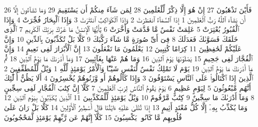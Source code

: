 {\tiny\colorbox{cl_aya}{26}} فَأَيْنَ تَذْهَبُونَ
{\tiny\colorbox{cl_aya}{27}} إِنْ هُوَ إِلَّا ذِكْرٌ لِّلْعَٰلَمِينَ
{\tiny\colorbox{cl_aya}{28}} لِمَن شَآءَ مِنكُمْ أَن يَسْتَقِيمَ
{\tiny\colorbox{cl_aya}{29}} وَمَا تَشَآءُونَ إِلَّآ أَن يَشَآءَ ٱللَّهُ رَبُّ ٱلْعَٰلَمِينَ
{\tiny\colorbox{cl_aya}{1}} إِذَا ٱلسَّمَآءُ ٱنفَطَرَتْ
{\tiny\colorbox{cl_aya}{2}} وَإِذَا ٱلْكَوَاكِبُ ٱنتَثَرَتْ
{\tiny\colorbox{cl_aya}{3}} وَإِذَا ٱلْبِحَارُ فُجِّرَتْ
{\tiny\colorbox{cl_aya}{4}} وَإِذَا ٱلْقُبُورُ بُعْثِرَتْ
{\tiny\colorbox{cl_aya}{5}} عَلِمَتْ نَفْسٌ مَّا قَدَّمَتْ وَأَخَّرَتْ
{\tiny\colorbox{cl_aya}{6}} يَٰٓأَيُّهَا ٱلْإِنسَٰنُ مَا غَرَّكَ بِرَبِّكَ ٱلْكَرِيمِ
{\tiny\colorbox{cl_aya}{7}} ٱلَّذِى خَلَقَكَ فَسَوَّىٰكَ فَعَدَلَكَ
{\tiny\colorbox{cl_aya}{8}} فِىٓ أَىِّ صُورَةٍ مَّا شَآءَ رَكَّبَكَ
{\tiny\colorbox{cl_aya}{9}} كَلَّا بَلْ تُكَذِّبُونَ بِٱلدِّينِ
{\tiny\colorbox{cl_aya}{10}} وَإِنَّ عَلَيْكُمْ لَحَٰفِظِينَ
{\tiny\colorbox{cl_aya}{11}} كِرَامًا كَٰتِبِينَ
{\tiny\colorbox{cl_aya}{12}} يَعْلَمُونَ مَا تَفْعَلُونَ
{\tiny\colorbox{cl_aya}{13}} إِنَّ ٱلْأَبْرَارَ لَفِى نَعِيمٍ
{\tiny\colorbox{cl_aya}{14}} وَإِنَّ ٱلْفُجَّارَ لَفِى جَحِيمٍ
{\tiny\colorbox{cl_aya}{15}} يَصْلَوْنَهَا يَوْمَ ٱلدِّينِ
{\tiny\colorbox{cl_aya}{16}} وَمَا هُمْ عَنْهَا بِغَآئِبِينَ
{\tiny\colorbox{cl_aya}{17}} وَمَآ أَدْرَىٰكَ مَا يَوْمُ ٱلدِّينِ
{\tiny\colorbox{cl_aya}{18}} ثُمَّ مَآ أَدْرَىٰكَ مَا يَوْمُ ٱلدِّينِ
{\tiny\colorbox{cl_aya}{19}} يَوْمَ لَا تَمْلِكُ نَفْسٌ لِّنَفْسٍ شَيْـًٔا وَٱلْأَمْرُ يَوْمَئِذٍ لِّلَّهِ
{\tiny\colorbox{cl_aya}{1}} وَيْلٌ لِّلْمُطَفِّفِينَ
{\tiny\colorbox{cl_aya}{2}} ٱلَّذِينَ إِذَا ٱكْتَالُوا۟ عَلَى ٱلنَّاسِ يَسْتَوْفُونَ
{\tiny\colorbox{cl_aya}{3}} وَإِذَا كَالُوهُمْ أَو وَّزَنُوهُمْ يُخْسِرُونَ
{\tiny\colorbox{cl_aya}{4}} أَلَا يَظُنُّ أُو۟لَٰٓئِكَ أَنَّهُم مَّبْعُوثُونَ
{\tiny\colorbox{cl_aya}{5}} لِيَوْمٍ عَظِيمٍ
{\tiny\colorbox{cl_aya}{6}} يَوْمَ يَقُومُ ٱلنَّاسُ لِرَبِّ ٱلْعَٰلَمِينَ
{\tiny\colorbox{cl_aya}{7}} كَلَّآ إِنَّ كِتَٰبَ ٱلْفُجَّارِ لَفِى سِجِّينٍ
{\tiny\colorbox{cl_aya}{8}} وَمَآ أَدْرَىٰكَ مَا سِجِّينٌ
{\tiny\colorbox{cl_aya}{9}} كِتَٰبٌ مَّرْقُومٌ
{\tiny\colorbox{cl_aya}{10}} وَيْلٌ يَوْمَئِذٍ لِّلْمُكَذِّبِينَ
{\tiny\colorbox{cl_aya}{11}} ٱلَّذِينَ يُكَذِّبُونَ بِيَوْمِ ٱلدِّينِ
{\tiny\colorbox{cl_aya}{12}} وَمَا يُكَذِّبُ بِهِۦٓ إِلَّا كُلُّ مُعْتَدٍ أَثِيمٍ
{\tiny\colorbox{cl_aya}{13}} إِذَا تُتْلَىٰ عَلَيْهِ ءَايَٰتُنَا قَالَ أَسَٰطِيرُ ٱلْأَوَّلِينَ
{\tiny\colorbox{cl_aya}{14}} كَلَّا بَلْ رَانَ عَلَىٰ قُلُوبِهِم مَّا كَانُوا۟ يَكْسِبُونَ
{\tiny\colorbox{cl_aya}{15}} كَلَّآ إِنَّهُمْ عَن رَّبِّهِمْ يَوْمَئِذٍ لَّمَحْجُوبُونَ
